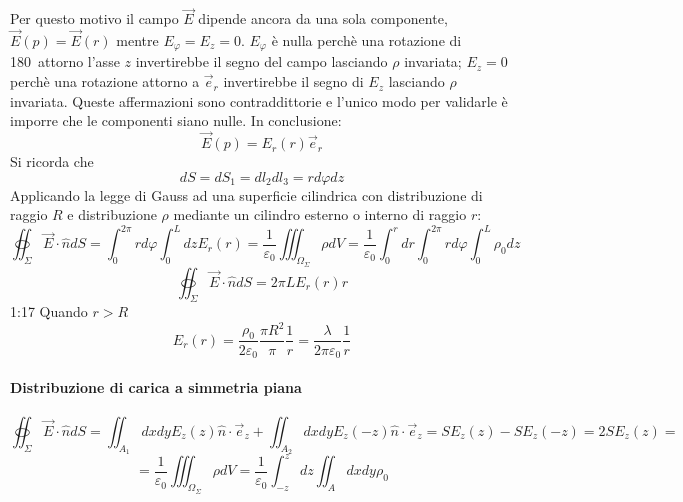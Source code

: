 Per questo motivo il campo $\vec{E}$ dipende ancora da una sola componente, $\vec{E}(p) = \vec{E}(r)$
mentre $E_\varphi = E_z = 0$. $E_\varphi$ è nulla perchè una rotazione di 180\textdegree\ attorno
l'asse $z$ invertirebbe il segno del campo lasciando $\rho$ invariata; $E_z = 0$ perchè una rotazione
attorno a $\vec{e}_r$ invertirebbe il segno di $E_z$ lasciando $\rho$ invariata.
Queste affermazioni sono contraddittorie e l'unico modo per validarle è imporre che le componenti
siano nulle. In conclusione:
$$
\vec{E}(p) = E_r(r)\vec{e}_r
$$
Si ricorda che
$$
dS = dS_1 = dl_2 dl_3 = rd\varphi dz
$$
Applicando la legge di Gauss ad una superficie cilindrica con distribuzione di raggio $R$ e distribuzione $\rho$ mediante un cilindro esterno o interno di raggio $r$:
$$
\oiint_\Sigma\vec{E}\cdot\hat{n}dS = \int_0^{2\pi}rd\varphi \int_0^L dz E_r(r) = \frac{1}{\varepsilon_0}
\iiint_{\Omega_\Sigma}\rho dV = \frac{1}{\varepsilon_0} \int_{0}^{r}dr\int_{0}^{2\pi} rd\varphi\int_0^L \rho_0 dz 
$$
$$
\oiint_\Sigma\vec{E}\cdot\hat{n}dS = 2\pi L E_r(r) r
$$
1:17
Quando $r > R$ 
$$
E_r(r) = \frac{\rho_0}{2\varepsilon_0} \frac{\pi R^2}{\pi} \frac{1}{r} = 
\frac{\lambda}{2\pi\varepsilon_0} \frac{1}{r}
$$

\paragraph{Distribuzione di carica a simmetria piana}

$$
\oiint_\Sigma \vec{E}\cdot\hat{n}dS = \iint_{A_1} dxdy E_z(z)\hat{n}\cdot\vec{e}_z + 
\iint_{A_2} dxdy E_z(-z)\hat{n}\cdot\vec{e}_z = SE_z(z) -SE_z(-z) = 2 S E_z(z) =
$$
$$
=\frac{1}{\varepsilon_0} \iiint_{\Omega_\Sigma} \rho dV = \frac{1}{\varepsilon_0} \int_{-z}^{z}dz \iint_A dxdy\rho_0
$$




